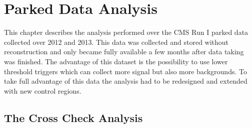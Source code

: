 \chapter{Parked Data Analysis}
\label{CHAPTER:ParkedDataAnalysis}

\glsresetall %

This chapter describes the analysis performed over the \gls{CMS} Run I parked data collected over 2012 and 2013. This data was collected and stored without reconstruction and only became fully available a few months after data taking was finished. The advantage of this dataset is the possibility to use lower threshold triggers which can collect more signal but also more backgrounds. To take full advantage of this data the analysis had to be redesigned and extended with new control regions.

% 
% 

\section{The Cross Check Analysis}


